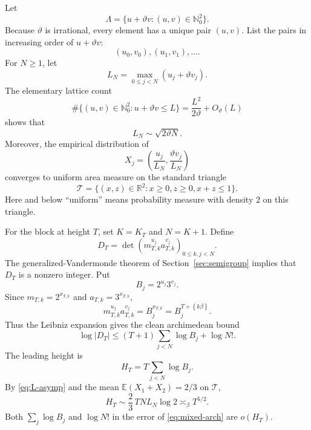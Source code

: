 \documentclass[11pt,oneside]{article}
\theoremstyle{definition}
\theoremstyle{remark}
\newcommand{\Nzero}{\mathbb N_0}
\newcommand{\R}{\mathbb R}
\newcommand{\fract}[1]{\left\{#1\right\}}
\newcommand{\DeltaTri}{\mathcal T}
\begin{document}
Let
\[
  \Lambda=\{u+\vartheta v:(u,v)\in\Nzero^2\}.
\]
Because $\vartheta$ is irrational, every element has a unique pair $(u,v)$.  List the pairs
in increasing order of $u+\vartheta v$:
\[
  (u_0,v_0),(u_1,v_1),\ldots.
\]
For $N\ge1$, let
\[
  L_N=\max_{0\le j<N}(u_j+\vartheta v_j).
\]
The elementary lattice count
\begin{equation}\label{eq:semigroup-count}
 \#\{(u,v)\in\Nzero^2:u+\vartheta v\le L\}
 =\frac{L^2}{2\vartheta}+O_\vartheta(L)
\end{equation}
shows that
\begin{equation}\label{eq:L-asymp}
  L_N\sim\sqrt{2\vartheta N}.
\end{equation}
Moreover, the empirical distribution of
\begin{equation}\label{eq:scaled-cols}
  X_j=\left(\frac{u_j}{L_N},\frac{\vartheta v_j}{L_N}\right)
\end{equation}
converges to uniform area measure on the standard triangle
\begin{equation}\label{eq:triangle}
  \DeltaTri=\{(x,z)\in\R^2:x\ge0,
  z\ge0,
  x+z\le1\}.
\end{equation}
Here and below ``uniform'' means probability measure with density $2$ on this triangle.

For the block at height $T$, set $K=K_T$ and $N=K+1$.  Define
\begin{equation}\label{eq:mixed-D}
  D_T=\det\left(m_{T,k}^{u_j}a_{T,k}^{v_j}\right)_{0\le k,j<N}.
\end{equation}
The generalized-Vandermonde theorem of Section~\ref{sec:semigroup} implies that $D_T$ is a
nonzero integer.  Put
\[
  B_j=2^{u_j}3^{v_j}.
\]
Since $m_{T,k}=2^{x_{T,k}}$ and $a_{T,k}=3^{x_{T,k}}$,
\begin{equation}\label{eq:entry-B}
  m_{T,k}^{u_j}a_{T,k}^{v_j}=B_j^{x_{T,k}}
  =B_j^{T+\fract{k\beta}}.
\end{equation}
Thus the Leibniz expansion gives the clean archimedean bound
\begin{equation}\label{eq:mixed-arch}
  \log|D_T|
  \le (T+1)\sum_{j<N}\log B_j+\log N!.
\end{equation}
The leading height is
\begin{equation}\label{eq:HT}
  H_T=T\sum_{j<N}\log B_j.
\end{equation}
By \eqref{eq:L-asymp} and the mean
$\mathbb E(X_1+X_2)=2/3$ on $\DeltaTri$,
\begin{equation}\label{eq:H-asymp}
 H_T\sim \frac23\,TNL_N\log2
 \asymp_\beta T^{5/2}.
\end{equation}
Both $\sum_j\log B_j$ and $\log N!$ in the error of \eqref{eq:mixed-arch} are
$o(H_T)$.
\end{document}
